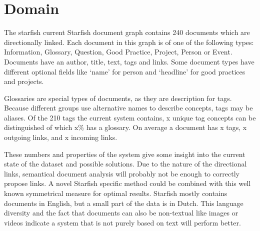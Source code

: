 

\section{Domain}
The starfish current Starfish document graph contains 240 documents which are directionally linked. Each document in this graph is of one of the following types: Information, Glossary, Question, Good Practice, Project, Person or Event. Documents have an author, title, text, tags and links. Some document types have different optional fields like `name' for person and `headline' for good practices and projects. 

Glossaries are special types of documents, as they are description for tags. Because different groups use alternative names to describe concepts, tags may be aliases. Of the 210 tags the current system contains, x unique tag concepts can be distinguished of which x\% has a glossary. On average a document has x tags, x outgoing links, and x incoming links.

These numbers and properties of the system give some insight into the current state of the dataset and possible solutions. Due to the nature of the directional links, semantical document analysis will probably not be enough to correctly propose links. A novel Starfish specific method could be combined with this well known symmetrical measure for optimal results. Starfish mostly contains documents in English, but a small part of the data is in Dutch. This language diversity and the fact that documents can also be non-textual like images or videos indicate a system that is not purely based on text will perform better.

